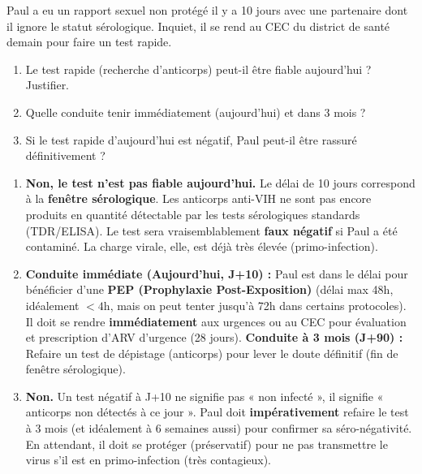 \documentclass[11pt]{article}
\begin{document}
\begin{exercice}
Paul a eu un rapport sexuel non protégé il y a 10 jours avec une partenaire dont il ignore le statut sérologique. Inquiet, il se rend au CEC du district de santé demain pour faire un test rapide.
\begin{enumerate}
    \item Le test rapide (recherche d'anticorps) peut-il être fiable aujourd'hui ? Justifier.
    \item Quelle conduite tenir immédiatement (aujourd'hui) et dans 3 mois ?
    \item Si le test rapide d'aujourd'hui est négatif, Paul peut-il être rassuré définitivement ?
\end{enumerate}
\end{exercice}

\begin{corrige}
\begin{enumerate}
    \item \textbf{Non, le test n'est pas fiable aujourd'hui.} Le délai de 10 jours correspond à la \textbf{fenêtre sérologique}. Les anticorps anti-VIH ne sont pas encore produits en quantité détectable par les tests sérologiques standards (TDR/ELISA). Le test sera vraisemblablement \textbf{faux négatif} si Paul a été contaminé. La charge virale, elle, est déjà très élevée (primo-infection).
    \item \textbf{Conduite immédiate (Aujourd'hui, J+10) :} Paul est dans le délai pour bénéficier d'une \textbf{PEP (Prophylaxie Post-Exposition)} (délai max 48h, idéalement $< 4$h, mais on peut tenter jusqu'à 72h dans certains protocoles). Il doit se rendre \textbf{immédiatement} aux urgences ou au CEC pour évaluation et prescription d'ARV d'urgence (28 jours). \textbf{Conduite à 3 mois (J+90) :} Refaire un test de dépistage (anticorps) pour lever le doute définitif (fin de fenêtre sérologique).
    \item \textbf{Non.} Un test négatif à J+10 ne signifie pas « non infecté », il signifie « anticorps non détectés à ce jour ». Paul doit \textbf{impérativement} refaire le test à 3 mois (et idéalement à 6 semaines aussi) pour confirmer sa séro-négativité. En attendant, il doit se protéger (préservatif) pour ne pas transmettre le virus s'il est en primo-infection (très contagieux).
\end{enumerate}
\end{corrige}
\end{document}
